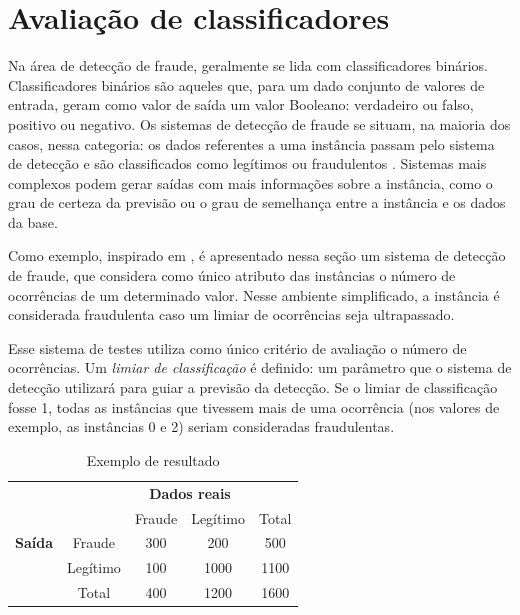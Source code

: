 \section{Avaliação de classificadores}

Na área de detecção de fraude, geralmente se lida com classificadores binários. Classificadores binários são aqueles que, para um dado conjunto de valores de entrada, geram como valor de saída um valor Booleano: verdadeiro ou falso, positivo ou negativo. Os sistemas de detecção de fraude se situam, na maioria dos casos, nessa categoria: os dados referentes a uma instância passam pelo sistema de detecção e são classificados como legítimos ou fraudulentos \cite{Bewick2004}. Sistemas mais complexos podem gerar saídas com mais informações sobre a instância, como o grau de certeza da previsão ou o grau de semelhança entre a instância e os dados da base.

Como exemplo, inspirado em \citet{Bewick2004}, é apresentado nessa seção um sistema de detecção de fraude, que considera como único atributo das instâncias o número de ocorrências de um determinado valor. Nesse ambiente simplificado, a instância é considerada fraudulenta caso um limiar de ocorrências seja ultrapassado.

Esse sistema de testes utiliza como único critério de avaliação o número de ocorrências. Um \emph{limiar de classificação} é definido: um parâmetro que o sistema de detecção utilizará para guiar a previsão da detecção. Se o limiar de classificação fosse 1, todas as instâncias que tivessem mais de uma ocorrência (nos valores de exemplo, as instâncias 0 e 2) seriam consideradas fraudulentas.

\vspace{0.5cm}
\renewcommand{\arraystretch}{1.5}
\begin{table}[h]
    \centering
    \caption{Exemplo de resultado}
    \label{fraud:ex}
    \vspace{0.5cm}
    \begin{tabular}{c l c c c}
        & & \multicolumn{2}{c}{\textbf{Dados reais}} \\
        \multirow{3}{5mm}{\begin{sideways}\parbox{20mm}{\textbf{Saída}}\end{sideways}} & \multicolumn{1}{c|}{} & Fraude & Legítimo & \multicolumn{1}{|c}{Total} \\
        \cline{2-5}
        & \multicolumn{1}{c|}{Fraude}   & 300 & 200   & \multicolumn{1}{|c}{500}  \\
        & \multicolumn{1}{c|}{Legítimo} & 100 & 1000  & \multicolumn{1}{|c}{1100} \\
        \cline{2-5}
        & \multicolumn{1}{c|}{Total}    & 400 & 1200  & \multicolumn{1}{|c}{1600} \\
    \end{tabular}
\end{table}
\vspace{0.5cm}

